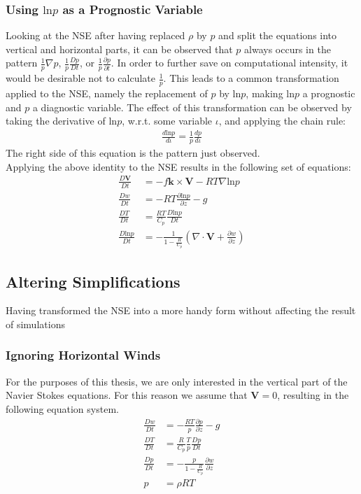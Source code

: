\subsubsection{Using $\text{ln}p$ as a Prognostic Variable}
Looking at the NSE after having replaced $\rho$ by $p$ and split the equations into vertical and horizontal parts, it can be observed that $p$ always occurs in the pattern $\frac{1}{p}\nabla p$, $\frac{1}{p}\frac{Dp}{Dt}$, or $\frac{1}{p}\frac{\partial p}{\partial t}$.
In order to further save on computational intensity, it would be desirable not to calculate $\frac{1}{p}$.
This leads to a common transformation applied to the NSE, namely the replacement of $p$ by $\text{ln}p$, making $\text{ln}p$ a prognostic and $p$ a diagnostic variable.
The effect of this transformation can be observed by taking the derivative of $\text{ln}p$, w.r.t. some variable $\iota$, and applying the chain rule:
\begin{align*}
\frac{d\text{ln}p}{d\iota} =  \frac{1}{p}\frac{dp}{d\iota}
\end{align*}
The right side of this equation is the pattern just observed.
\\
Applying the above identity to the NSE results in the following set of equations:
\begin{align*}
\frac{D\textbf{V}}{Dt} &= -f\boldsymbol{k} \times \textbf{V} - RT\nabla \text{ln}p\\
\frac{Dw}{Dt} &= - RT \frac{\partial \text{ln}p}{\partial z} - g \\
\frac{DT}{Dt} &= \frac{RT}{C_p}\frac{D\text{ln}p}{Dt}\\
\frac{D\text{ln}p}{Dt} &= -\frac{1}{1- \frac{R}{C_p}} (\nabla \cdot \textbf{V} + \frac{\partial w}{\partial z})
\end{align*}

\subsection{Altering Simplifications}
Having transformed the NSE into a more handy form without affecting the result of simulations
\subsubsection{Ignoring Horizontal Winds}
For the purposes of this thesis, we are only interested in the vertical part of the Navier Stokes equations.
For this reason we assume that $\textbf{V}=0$, resulting in the following equation system.
\begin{align*}
\frac{Dw}{Dt} &= - \frac{RT}{p} \frac{\partial p}{\partial z} - g \\
\frac{DT}{Dt} &= \frac{R}{C_p}\frac{T}{p}\frac{Dp}{Dt}\\
\frac{Dp}{Dt} &= -\frac{p}{1- \frac{R}{C_p}} \frac{\partial w}{\partial z}\\
p &= \rho R T
\end{align*}

